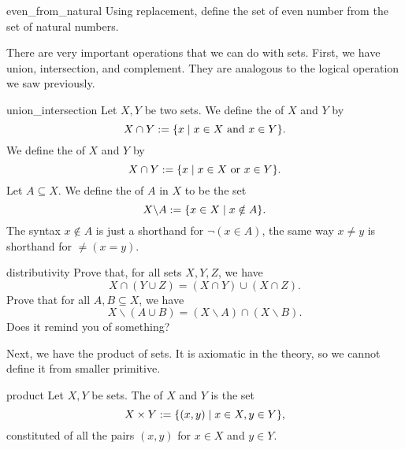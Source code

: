 \begin{cex}{}{even_from_natural}
    Using replacement, define the set of even number from the set of natural numbers.
\end{cex}

There are very important operations that we can do with sets. First, we have union, intersection, and complement. They are analogous to the logical operation we saw previously.

\begin{cdef}{}{union_intersection}
    Let \( X, Y \) be two sets. We define the  of \( X \) and \( Y \) by
    \begin{equation*}
        X \cap Y := \{ x \mid x \in X \text{ and } x \in Y \}.
    \end{equation*}
    We define the  of \( X \) and \( Y \) by
    \begin{equation*}
        X \cap Y := \{ x \mid x \in X \text{ or } x \in Y \}.
    \end{equation*}
    Let \( A \subseteq X \). We define the  of \( A \) in \( X \) to be the set
    \begin{equation*}
        X \backslash A := \{ x \in X \mid x \notin A \}.
    \end{equation*}
    The syntax \( x \notin A \) is just a shorthand for \( \neg (x \in A) \), the same way \( x \neq y \) is shorthand for \( \neq (x = y) \).
\end{cdef}

\begin{cex}{}{distributivity}
    Prove that, for all sets \( X, Y, Z \), we have 
    \begin{equation*}
        X \cap (Y \cup Z) = (X \cap Y) \cup (X \cap Z).
    \end{equation*}
    Prove that for all \( A, B \subseteq X \), we have
    \begin{equation*}
        X \backslash (A \cup B) = (X \backslash A) \cap (X \backslash B).
    \end{equation*}
    Does it remind you of something?
\end{cex}

Next, we have the product of sets. It is axiomatic in the theory, so we cannot define it from smaller primitive.
\begin{cdef}{}{product}
    Let \( X, Y \) be sets. The  of \( X \) and \( Y \) is the set
    \begin{equation*}
        X \times Y := \{ (x, y) \mid x \in X, y \in Y \},
    \end{equation*}
    constituted of all the pairs \( (x, y) \) for \( x \in X \) and \( y \in Y \).
\end{cdef}

